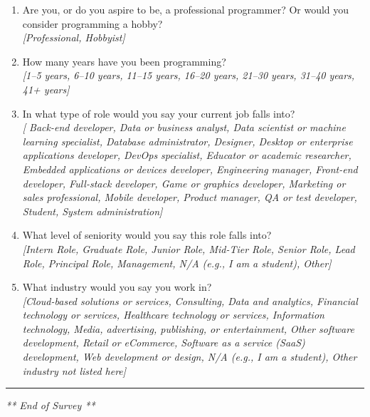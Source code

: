 \begin{enumerate}[label=Q8\alph*.,leftmargin=2\parindent]
  \item Are you, or do you aspire to be, a professional programmer? Or would you consider programming a hobby?\\\noindent \textit{\footnotesize[Professional, Hobbyist]}
  \item How many years have you been programming? \\\noindent\textit{\footnotesize
[1--5 years,
6--10 years,
11--15 years,
16--20 years,
21--30 years,
31--40 years,
41+ years]}
  \item In what type of role would you say your current job falls into? \\\noindent\textit{\footnotesize
[
Back-end developer,
Data or business analyst,
Data scientist or machine learning specialist,
Database administrator,
Designer,
Desktop or enterprise applications developer,
DevOps specialist,
Educator or academic researcher,
Embedded applications or devices developer,
Engineering manager,
Front-end developer,
Full-stack developer,
Game or graphics developer,
Marketing or sales professional,
Mobile developer,
Product manager,
QA or test developer,
Student,
System administration]}
  \item What level of seniority would you say this role falls into? \\\noindent\textit{\footnotesize
[Intern Role,
Graduate Role,
Junior Role,
Mid-Tier Role,
Senior Role,
Lead Role,
Principal Role,
Management,
N/A (e.g., I am a student),
Other]}

  \item What industry would you say you work in? \\\noindent\textit{\footnotesize
[Cloud-based solutions or services,
Consulting,
Data and analytics,
Financial technology or services,
Healthcare technology or services,
Information technology,
Media, advertising, publishing, or entertainment,
Other software development,
Retail or eCommerce,
Software as a service (SaaS) development,
Web development or design,
N/A (e.g., I am a student),
Other industry not listed here]}
\end{enumerate}
\bigskip\hrule\bigskip
\hspace{\fill}\textit{** End of Survey **}\hspace{\fill}